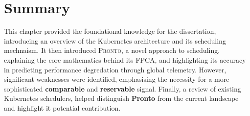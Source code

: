 \section{Summary}
This chapter provided the foundational knowledge for the dissertation,
introducing an overview of the Kubernetes architecture and its scheduling
mechnaism. It then introduced \textsc{Pronto}, a novel approach to scheduling,
explaining the core mathematics behind its FPCA, and highlighting its accuracy
in predicting performance degredation through global telemetry. However,
significant weaknesses were identified, emphasising the necessity for a more
sophisticated \textbf{comparable} and \textbf{reservable} signal. Finally, a
review of existing Kubernetes schedulers, helped distinguish \textbf{Pronto}
from the current landscape and highlight it potential contribution.


